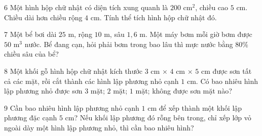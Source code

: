 \gap
\begin{probbox}{6}{}
Một hình hộp chữ nhật có diện tích xung quanh là $200$ cm$^2$, chiều cao $5$ cm. Chiều dài hơn chiều rộng $4$ cm. Tính thể tích hình hộp chữ nhật đó.
\end{probbox}
\gap
\begin{probbox}{7}{\relax}
Một bể bơi dài $25$ m, rộng $10$ m, sâu $1{,}6$ m. Một máy bơm mỗi giờ bơm được $50$ m$^3$ nước. Bể đang cạn, hỏi phải bơm trong bao lâu thì mực nước bằng $80\%$ chiều sâu của bể?
\end{probbox}
\gap
\begin{probbox}{8}{\relax}
Một khối gỗ hình hộp chữ nhật kích thước $3$ cm $\times$ $4$ cm $\times$ $5$ cm được sơn tất cả các mặt, rồi cắt thành các hình lập phương nhỏ cạnh $1$ cm. Có bao nhiêu hình lập phương nhỏ được sơn  $3$ mặt;  $2$ mặt;  $1$ mặt;  không được sơn mặt nào?
\end{probbox}
\gap
\begin{probbox}{9}{\relax}
Cần bao nhiêu hình lập phương nhỏ cạnh $1$ cm để xếp thành một khối lập phương đặc cạnh $5$ cm? Nếu khối lập phương đó rỗng bên trong, chỉ xếp lớp vỏ ngoài dày một hình lập phương nhỏ, thì cần bao nhiêu hình?
\end{probbox}
